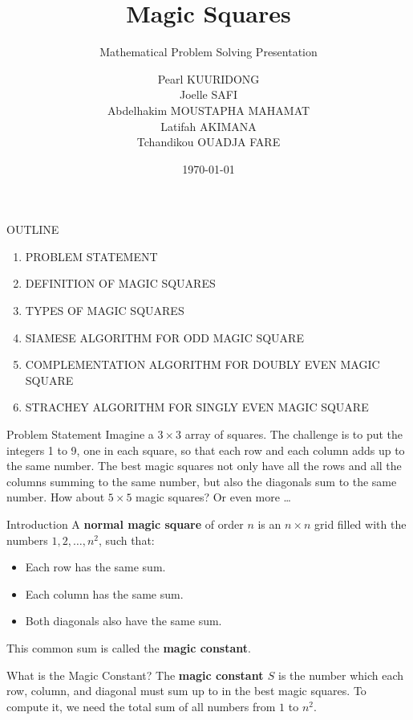\documentclass[11pt]{beamer}
\title{Magic Squares}
\subtitle{Mathematical Problem Solving Presentation}
\author{
	Pearl KUURIDONG \\ Joelle SAFI \\ Abdelhakim MOUSTAPHA MAHAMAT \\ Latifah AKIMANA \\ Tchandikou OUADJA FARE}
\date{\today}
\begin{document}
	
	\maketitle
	
	\begin{frame}{OUTLINE}
		\begin{enumerate}
			\item PROBLEM STATEMENT
			\item DEFINITION OF MAGIC SQUARES
			\item TYPES OF MAGIC SQUARES
			\item SIAMESE ALGORITHM FOR ODD MAGIC SQUARE
			\item COMPLEMENTATION ALGORITHM FOR DOUBLY EVEN MAGIC SQUARE
			\item STRACHEY ALGORITHM FOR SINGLY EVEN MAGIC SQUARE
		\end{enumerate}
	\end{frame}
	
	\begin{frame}{Problem Statement}
		Imagine a $3 \times 3$ array of squares. The challenge is to put the integers 1 to 9, one in each square, so that each row and each column adds up to the same number. The best magic squares not only have all the rows and all the columns summing to the same number, but also the diagonals sum to the same number. How about $5 \times 5$ magic squares? Or even more \ldots
	\end{frame}
	
	\begin{frame}{Introduction}
		A \textbf{normal magic square} of order $n$ is an $n \times n$ grid filled with 
		the numbers $1,2,\dots,n^2$, such that:
		\begin{itemize}
			\item Each row has the same sum.
			\item Each column has the same sum.
			\item Both diagonals also have the same sum.
		\end{itemize}
		
		This common sum is called the \textbf{magic constant}.
	\end{frame}
	
	\begin{frame}{What is the Magic Constant?}
		The \textbf{magic constant $S$} is the number which each row, column, and diagonal must sum up to in the best magic squares.
		To compute it, we need the total sum of all numbers from $1$ to $n^2$.
	\end{frame}
	
\end{document}
